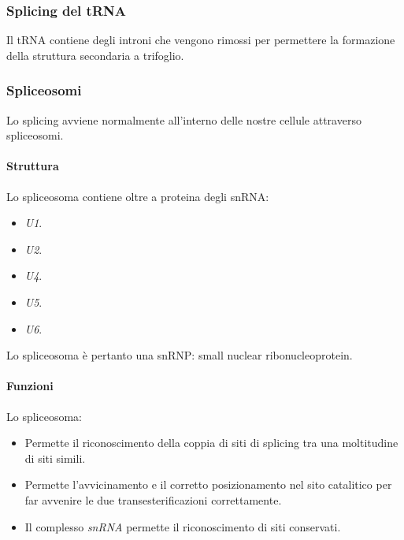		\subsubsection{Splicing del tRNA}
		Il tRNA contiene degli introni che vengono rimossi per permettere la formazione della struttura secondaria a trifoglio.

		\subsubsection{Spliceosomi}
		Lo splicing avviene normalmente all'interno delle nostre cellule attraverso spliceosomi.
	
			\paragraph{Struttura}
			Lo spliceosoma contiene oltre a proteina degli snRNA:
			\begin{multicols}{5}
				\begin{itemize}
					\item \emph{U1}.
					\item \emph{U2}.
					\item \emph{U4}.
					\item \emph{U5}.
					\item \emph{U6}.
				\end{itemize}
			\end{multicols}
			Lo spliceosoma \`e pertanto una snRNP: small nuclear ribonucleoprotein.

			\paragraph{Funzioni}
			Lo spliceosoma:
			\begin{multicols}{2}
				\begin{itemize}
					\item Permette il riconoscimento della coppia di siti di splicing tra una moltitudine di siti simili.
					\item Permette l'avvicinamento e il corretto posizionamento nel sito catalitico per far avvenire le due transesterificazioni correttamente.
					\item Il complesso \emph{snRNA} permette il riconoscimento di siti conservati.
				\end{itemize}
			\end{multicols}

